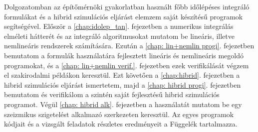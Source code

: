 Dolgozatomban az építőmérnöki gyakorlatban használt főbb időlépéses integráló formulákat és a hibrid szimulációs eljárást elemzem saját készítésű programok segítségével. Először a \ref{chap:idolep_tan}. fejezetben a numerikus integrálás elméleti hátterét és az integráló algoritmusokat  mutatom be lineáris, illetve nemlineáris rendszerek számítására. Ezután  a \ref{chap: lin+nemlin progi}. fejezetben bemutatom a formulák használatára  fejlesztett lineáris és nemlineáris megoldó programokat, és a \ref{chap: lin+nemlin verif.}. fejezetben ezek verifikálását végzem el szakirodalmi példákon keresztül. Ezt követően a \ref{chap:hibrid}. fejezetben a hibrid szimulációs eljárást ismertetem, majd a \ref{chap: hibrid progi}. fejezetben bemutatom és verifikálom a szintén saját fejlesztésű hibrid szimulációs programot. Végül \ref{chap: hibrid alk}. fejezetben a használatát mutatom be egy szeizmikus szigetelést alkalmazó szerkezeten keresztül. Az egyes programok kódjait és a vizsgált feladatok részletes eredményeit a Függelék tartalmazza.



